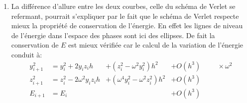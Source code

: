 \begin{enumerate}
\begin{enumerate}
  \item La différence d'allure entre les deux courbes, celle du schéma de Verlet se refermant, pourrait s'expliquer par le fait que le schéma de Verlet respecte mieux la propriété de conservation de l'énergie. En effet les lignes de niveau de l'énergie dans l'espace des phases sont ici des ellipses.\newline
  De fait la conservation de $E$ est mieux vérifiée car le calcul de la variation de l'énergie conduit à:
\begin{align*}
  y_{i+1}^2 &= y_i^2 + 2y_iz_i h& +(z_i^2-\omega^2 y_i^2)h^2& + O(h^3) \hspace{1cm} \times \omega^2\\
  z_{i+1}^2 &= z_i^2 -2\omega^2 y_i z_ih& +(\omega^4y_i^2 -\omega^2 z_i^2)h^2& + O(h^3)\\
  E_{i+1} &= E_i &  & + O(h^3)
\end{align*}

\end{enumerate}
\end{enumerate}


